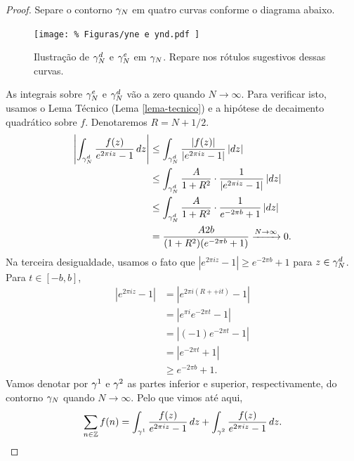 \begin{proof}
            Separe o contorno $\gamma_N$ em quatro curvas conforme o diagrama abaixo. 
            \begin{figure}[H]\centering
                \texttt{[image: \%
                    Figuras/yne e ynd.pdf
                ]}
                \caption{%
                    Ilustração de $\gamma_N^d$ e $\gamma_N^e$ em $\gamma_N$. Repare nos rótulos sugestivos dessas curvas.
                }
            \end{figure}
            As integrais sobre
            $\gamma_N^e$ e $\gamma_N^d$ vão a zero quando $N \to \infty$. Para verificar isto, usamos o 
            Lema Técnico (Lema \ref{lema-tecnico}) e a hipótese de decaimento quadrático sobre $f$. 
            Denotaremos $R = N + 1/2$.
            \begin{align*}
                \left |\int_{\gamma_N^d} \frac{f(z)}{e^{2 \pi i z} - 1}\,dz\right| 
                &\leq \int_{\gamma_N^d} \frac{|f(z)|}{|e^{2 \pi i z} - 1|}\,|dz| \\
                &\leq \int_{\gamma_N^d} \frac{A}{1 + R^2}\cdot\frac{1}{|e^{2 \pi i z} - 1|}\,|dz| \\
                &\leq \int_{\gamma_N^d} \frac{A}{1 + R^2}\cdot\frac{1}{e^{-2\pi b} + 1}\,|dz| \\
                & = \frac{A2b}{(1 + R^2)(e^{-2\pi b} + 1)} \xrightarrow{N \to \infty} 0.
            \end{align*}
            Na terceira desigualdade, usamos o fato que $|e^{2\pi i z} - 1| \geq e^{-2 \pi b} + 1$ 
            para $z \in \gamma_N^d$. Para $t \in [-b,b]$,
            \begin{align*}
                |e^{2 \pi i z} - 1| &= |e^{2 \pi i(R+ + i t)} - 1| \\
                &= |e^{\pi i}e^{-2\pi t} - 1| \\
                & = |(-1)e^{-2\pi t} - 1| \\
                &= |e^{-2\pi t} + 1| \\
                &\geq e^{-2\pi b} + 1.
            \end{align*}
            Vamos denotar por $\gamma^1$ e $\gamma^2$ as partes inferior e superior, respectivamente, 
            do contorno $\gamma_N$ quando $N \to \infty$. Pelo que vimos até aqui,
            \begin{equation*}
                \sum_{n \in \Z}f(n) = \int_{\y^1}\frac{f(z)}{e^{2\pi i z} - 1}\,dz 
                                    + \int_{\y^2}\frac{f(z)}{e^{2\pi i z} - 1}\,dz.

\end{equation*}
\end{proof}

